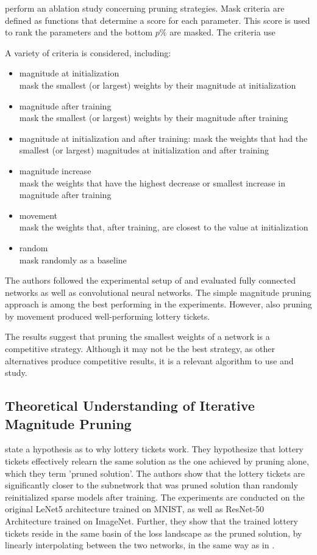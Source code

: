 \textcite{Supermasks} perform an ablation study concerning pruning strategies. Mask criteria are defined as functions that determine a score for each parameter. This score is used to rank the parameters and the bottom $p\%$ are masked.
The criteria use 


A variety of criteria is considered, including: 
\begin{itemize}
  \item magnitude at initialization \\
  mask the smallest (or largest) weights by their magnitude at initialization
  \item magnitude after training \\
  mask the smallest (or largest) weights by their magnitude after training
  \item magnitude at initialization and after training: mask the weights that had the smallest (or largest) magnitudes at initialization and after training
  \item magnitude increase \\
  mask the weights that have the highest decrease or smallest increase in magnitude after training
  \item movement \\
  mask the weights that, after training, are closest to the value at initialization
  \item random \\
  mask randomly as a baseline
\end{itemize}

The authors followed the experimental setup of \textcite{LTH} and evaluated fully connected networks as well as convolutional neural networks. The simple magnitude pruning approach is among the best performing in the experiments. However, also pruning by movement produced well-performing lottery tickets.

The results suggest that pruning the smallest weights of a network is a competitive strategy. Although it may not be the best strategy, as other alternatives produce competitive results, it is a relevant algorithm to use and study. 

\subsection{Theoretical Understanding of Iterative Magnitude Pruning}
\textcite{WhyLotteryTicketsWin} state a hypothesis as to why lottery tickets work. They hypothesize that lottery tickets effectively relearn the same solution as the one achieved by pruning alone, which they term 'pruned solution'.
The authors show that the lottery tickets are significantly closer to the subnetwork that was pruned solution than randomly reinitialized sparse models after training. 
The experiments are conducted on the original LeNet5 architecture trained on MNIST, as well as ResNet-50 Architecture trained on ImageNet. Further, they show that the trained lottery tickets reside in the same basin of the loss landscape as the pruned solution, by linearly interpolating between the two networks, in the same way as in \autocite{LinearModeConnectivity}.

